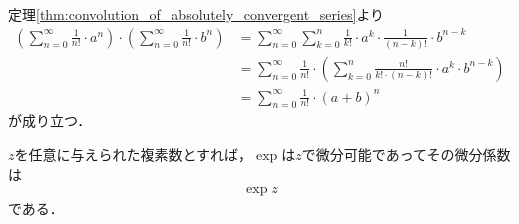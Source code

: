 	\begin{sketch}
		定理\ref{thm:convolution_of_absolutely_convergent_series}より
		\begin{align}
			\left(\sum_{n=0}^\infty \frac{1}{n!} \cdot a^n\right) \cdot \left(\sum_{n=0}^\infty \frac{1}{n!} \cdot b^n\right)
			&= \sum_{n=0}^\infty \sum_{k=0}^n \frac{1}{k!} \cdot a^k \cdot \frac{1}{(n-k)!} \cdot b^{n-k} \\
			&= \sum_{n=0}^\infty \frac{1}{n!} \cdot \left( \sum_{k=0}^n \frac{n!}{k! \cdot (n-k)!} \cdot a^k \cdot b^{n-k} \right) \\
			&= \sum_{n=0}^\infty \frac{1}{n!} \cdot (a+b)^n
		\end{align}
		が成り立つ．
		\QED
	\end{sketch}
	
	\begin{screen}
		\begin{thm}[指数関数は各点で微分可能]
			$z$を任意に与えられた複素数とすれば，$\exp$は$z$で微分可能であってその微分係数は
			\begin{align}
				\exp{z}
			\end{align}
			である．
		\end{thm}
	\end{screen}
	
